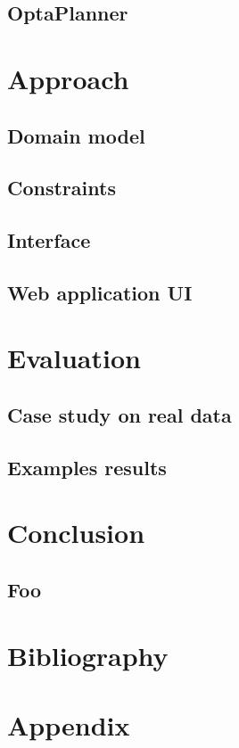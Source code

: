 \documentclass[12pt, a4paper, english]{report}
\begin{document}
\subsection{OptaPlanner}

\section{Approach}
\subsection{Domain model}
\subsection{Constraints}
\subsection{Interface}
\subsection{Web application UI}

\section{Evaluation}
\subsection{Case study on real data}
\subsection{Examples results}

\section{Conclusion}
\subsection{Foo}

\section{Bibliography}
\section{Appendix}
\end{document}
